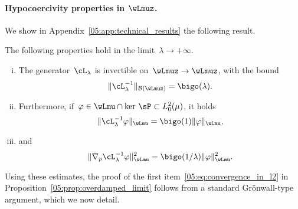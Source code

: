 \paragraph{Hypocoercivity properties in $\wLmuz$.}
We show in Appendix~\ref{05:app:technical_results} the following result.
\begin{lemma}
    \label{05:lemma:hypocoercivity}
     The following properties hold in the limit~$\lambda\to+\infty$.
    \begin{enumerate}[i)]
        \item{
        The generator~$\cL_\lambda$ is invertible on~$\wLmuz\to\wLmuz$, with the bound    
        \begin{equation}
        \|\cL_\lambda^{-1}\|_{\mathcal B(\wLmuz)} = \bigo(\lambda).
        \end{equation}}
        \item{Furthermore, if~$\varphi\in \wLmu\cap\ker\,\sP\subset L_0^2(\mu)$, it holds
        \begin{equation}
        \|\cL_\lambda^{-1}\varphi\|_{\wLmu} = \bigo(1)\|\varphi\|_{\wLmu},
        \end{equation}}
        \item{
        and
            \begin{equation}
                \|\nabla_p\cL_\lambda^{-1}\varphi\|^2_{\wLmu} = \bigo(1/\lambda)\|\varphi\|^2_{\wLmu}.
            \end{equation}
        }
    \end{enumerate}
\end{lemma}
Using these estimates, the proof of the first item~\eqref{05:eq:convergence_in_l2} in Proposition~\ref{05:prop:overdamped_limit} follows from a standard Gr\"onwall-type argument, which we now detail.

